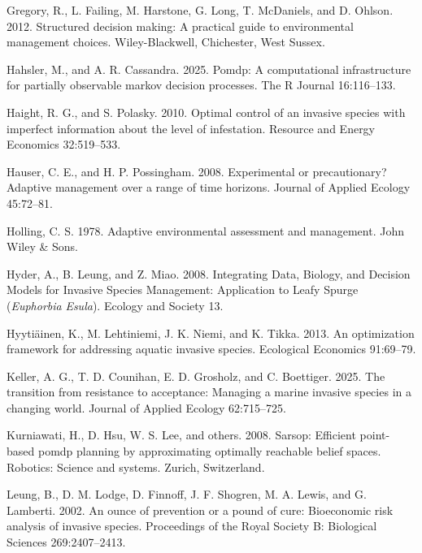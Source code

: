 \documentclass[
  11pt,
  a4paper,
]{article}
\newlength{\cslhangindent}
\newenvironment{CSLReferences}[2] %
 {\begin{list}{}{%
  \setlength{\itemindent}{0pt}
  \setlength{\leftmargin}{0pt}
  \setlength{\parsep}{0pt}
  \ifodd #1
   \setlength{\leftmargin}{\cslhangindent}
   \setlength{\itemindent}{-1\cslhangindent}
  \fi
  \setlength{\itemsep}{#2\baselineskip}}}
 {\end{list}}
\begin{document}
\begin{CSLReferences}{1}{0}
Gregory, R., L. Failing, M. Harstone, G. Long, T. McDaniels, and D. Ohlson. 2012. Structured decision making: A practical guide to environmental management choices. Wiley-Blackwell, Chichester, West Sussex.

Hahsler, M., and A. R. Cassandra. 2025. Pomdp: A computational infrastructure for partially observable markov decision processes. The R Journal 16:116--133.

Haight, R. G., and S. Polasky. 2010. Optimal control of an invasive species with imperfect information about the level of infestation. Resource and Energy Economics 32:519--533.

Hauser, C. E., and H. P. Possingham. 2008. Experimental or precautionary? {Adaptive} management over a range of time horizons. Journal of Applied Ecology 45:72--81.

Holling, C. S. 1978. Adaptive environmental assessment and management. John Wiley \& Sons.

Hyder, A., B. Leung, and Z. Miao. 2008. {Integrating Data}, {Biology}, and {Decision Models} for {Invasive Species Management}: {Application} to {Leafy Spurge} ({\emph{Euphorbia}}{ \emph{Esula}}). Ecology and Society 13.

Hyytiäinen, K., M. Lehtiniemi, J. K. Niemi, and K. Tikka. 2013. An optimization framework for addressing aquatic invasive species. Ecological Economics 91:69--79.

Keller, A. G., T. D. Counihan, E. D. Grosholz, and C. Boettiger. 2025. The transition from resistance to acceptance: Managing a marine invasive species in a changing world. Journal of Applied Ecology 62:715--725.

Kurniawati, H., D. Hsu, W. S. Lee, and others. 2008. Sarsop: Efficient point-based pomdp planning by approximating optimally reachable belief spaces. Robotics: Science and systems. Zurich, Switzerland.

Leung, B., D. M. Lodge, D. Finnoff, J. F. Shogren, M. A. Lewis, and G. Lamberti. 2002. An ounce of prevention or a pound of cure: Bioeconomic risk analysis of invasive species. Proceedings of the Royal Society B: Biological Sciences 269:2407--2413.


\end{CSLReferences}
\end{document}
